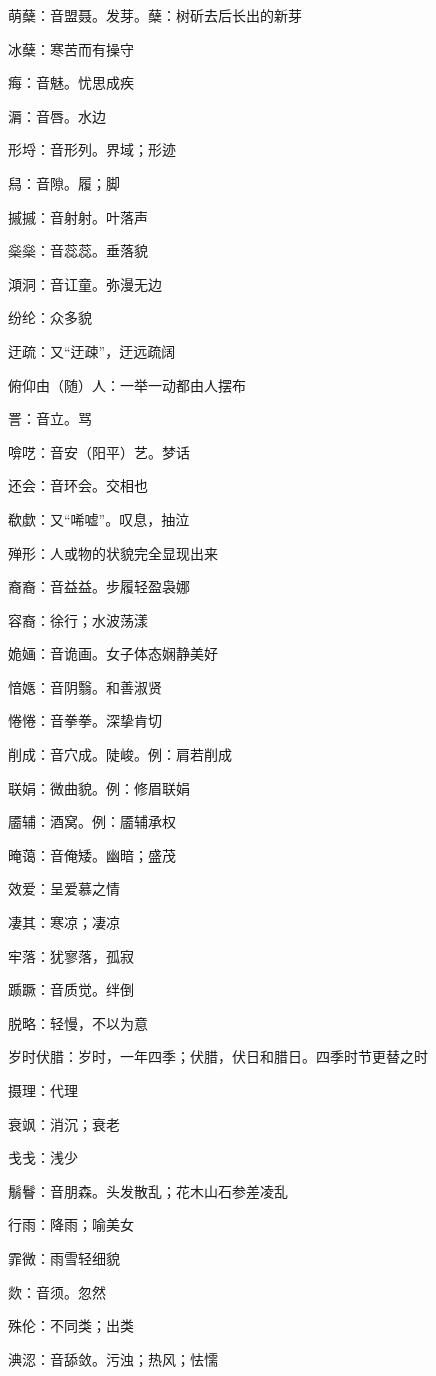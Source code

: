 萌蘖：音盟聂。发芽。蘖：树斫去后长出的新芽

冰蘖：寒苦而有操守

痗：音魅。忧思成疾

漘：音唇。水边

形埒：音形列。界域；形迹

舄：音隙。履；脚

摵摵：音射射。叶落声

橤橤：音蕊蕊。垂落貌

澒洞：音讧童。弥漫无边

纷纶：众多貌

迂疏：又“迂疎”，迂远疏阔

俯仰由（随）人：一举一动都由人摆布

詈：音立。骂

啽呓：音安（阳平）艺。梦话

还会：音环会。交相也

欷歔：又“唏嘘”。叹息，抽泣

殚形：人或物的状貌完全显现出来

裔裔：音益益。步履轻盈袅娜

容裔：徐行；水波荡漾

姽婳：音诡画。女子体态娴静美好

愔嫕：音阴翳。和善淑贤

惓惓：音拳拳。深挚肯切

削成：音穴成。陡峻。例：肩若削成

联娟：微曲貌。例：修眉联娟

靥辅：酒窝。例：靥辅承权

晻蔼：音俺矮。幽暗；盛茂

效爱：呈爱慕之情

凄其：寒凉；凄凉

牢落：犹寥落，孤寂

踬蹶：音质觉。绊倒

脱略：轻慢，不以为意

岁时伏腊：岁时，一年四季；伏腊，伏日和腊日。四季时节更替之时

摄理：代理

衰飒：消沉；衰老

戋戋：浅少

鬅鬙：音朋森。头发散乱；花木山石参差凌乱

行雨：降雨；喻美女

霏微：雨雪轻细貌

欻：音须。忽然

殊伦：不同类；出类

淟涊：音舔敛。污浊；热风；怯懦

